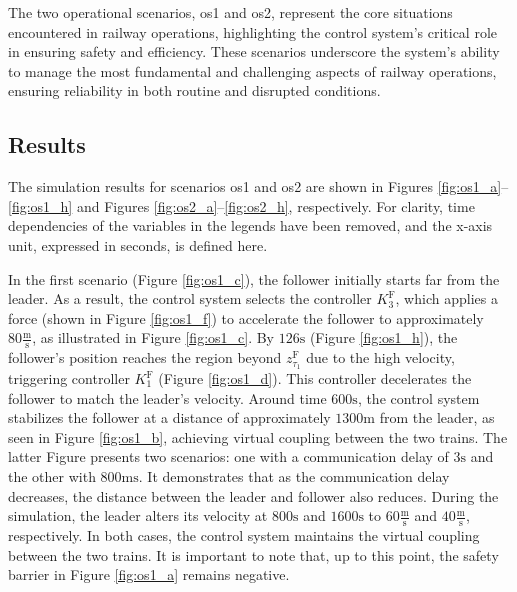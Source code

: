 \documentclass[letterpaper, 10 pt, conference]{ieeeconf}
\theoremstyle{definition}
\theoremstyle{nopoint}
\begin{document}
 
 The two operational scenarios, \gls{os}1 and \gls{os}2, represent the core situations encountered in railway operations, highlighting the control system's critical role in ensuring safety and efficiency. These scenarios underscore the system’s ability to manage the most fundamental and challenging aspects of railway operations, ensuring reliability in both routine and disrupted conditions.
  		
		 \subsection{Results}
		\label{sec:results}
		
		The simulation results for scenarios \gls{os}1 and \gls{os}2 are shown in Figures \ref{fig:os1_a}–\ref{fig:os1_h} and Figures \ref{fig:os2_a}–\ref{fig:os2_h}, respectively. For clarity, time dependencies of the variables in the legends have been removed, and the x-axis unit, expressed in seconds, is defined here.
		
		In the first scenario (Figure \ref{fig:os1_c}), the follower initially starts far from the leader. As a result, the control system selects the controller $K_3^\mathrm{F}$, which applies a force (shown in Figure \ref{fig:os1_f}) to accelerate the follower to approximately $80 \frac{\unit{\meter}}{\unit{\second}}$, as illustrated in Figure \ref{fig:os1_c}. By $126\unit{\second}$ (Figure \ref{fig:os1_h}), the follower’s position reaches the region beyond $z_{\tau_1}^\mathrm{F}$ due to the high velocity, triggering controller $K_1^\mathrm{F}$ (Figure \ref{fig:os1_d}). This controller decelerates the follower to match the leader's velocity. Around time $600\unit{\second}$, the control system stabilizes the follower at a distance of approximately $1300 \unit{\meter}$ from the leader, as seen in Figure \ref{fig:os1_b}, achieving virtual coupling between the two trains. The latter Figure presents two scenarios: one with a communication delay of $3 \unit{\second}$ and the other with  $800 \unit{\milli\second}$. It demonstrates that as the communication delay decreases, the distance between the leader and follower also reduces. During the simulation, the leader alters its velocity at $800\unit{\second}$ and $1600\unit{\second}$ to $60 \frac{\unit{\meter}}{\unit{\second}}$ and $40 \frac{\unit{\meter}}{\unit{\second}}$, respectively. In both cases, the control system maintains the virtual coupling between the two trains. It is important to note that, up to this point, the safety barrier in Figure \ref{fig:os1_a} remains negative.
		
\end{document}
